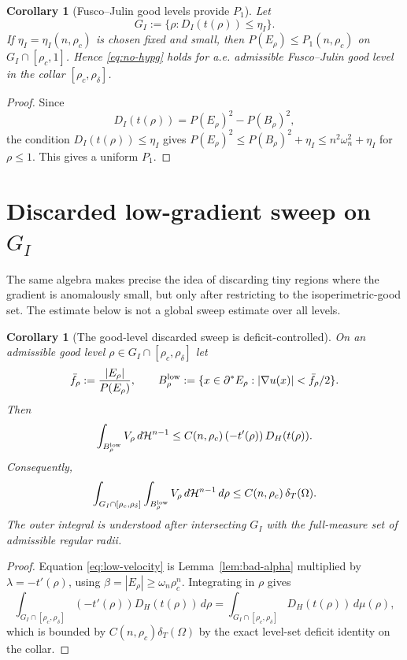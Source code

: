 \documentclass[11pt]{article}
\newtheorem{corollary}[theorem]{Corollary}
\theoremstyle{definition}
\newcommand{\Om}{\Omega}
\newcommand{\Hn}{\mathcal H^{n-1}}
\begin{document}
\begin{corollary}[Fusco--Julin good levels provide $P_1$]
\label{cor:FJ-good}
Let
\[
   G_I:=\{\rho: D_I(t(\rho))\le\eta_I\}.
\]
If $\eta_I=\eta_I(n,\rho_c)$ is chosen fixed and small, then
$P(E_\rho)\le P_1(n,\rho_c)$ on $G_I\cap[\rho_c,1]$.  Hence
\eqref{eq:no-hypg} holds for a.e. admissible Fusco--Julin good level in
the collar $[\rho_c,\rho_\delta]$.
\end{corollary}

\begin{proof}
Since
\[
   D_I(t(\rho))=P(E_\rho)^2-P(B_\rho)^2,
\]
the condition $D_I(t(\rho))\le\eta_I$ gives
$P(E_\rho)^2\le P(B_\rho)^2+\eta_I\le n^2\omega_n^2+\eta_I$ for
$\rho\le1$.  This gives a uniform $P_1$.
\end{proof}

\section{Discarded low-gradient sweep on $G_I$}

The same algebra makes precise the idea of discarding tiny regions where
the gradient is anomalously small, but only after restricting to the
isoperimetric-good set.  The estimate below is not a global sweep
estimate over all levels.

\begin{corollary}[The good-level discarded sweep is deficit-controlled]
\label{cor:sweep}
On an admissible good level $\rho\in G_I\cap[\rho_c,\rho_\delta]$ let
\[
   \bar f_\rho:=\frac{|E_\rho|}{P(E_\rho)},\qquad
   B_\rho^{\rm low}:=\{x\in\partial^*E_\rho:
      |\nabla u(x)|<\bar f_\rho/2\}.
\]
Then
\begin{equation}\label{eq:low-velocity}
   \int_{B_\rho^{\rm low}}V_\rho\,d\Hn
   \le C(n,\rho_c)\,(-t'(\rho))\,D_H(t(\rho)).
\end{equation}
Consequently,
\begin{equation}\label{eq:swept-volume}
   \int_{G_I\cap[\rho_c,\rho_\delta]}
      \int_{B_\rho^{\rm low}}V_\rho\,d\Hn\,d\rho
   \le C(n,\rho_c)\,\delta_T(\Om).
\end{equation}
The outer integral is understood after intersecting $G_I$ with the
full-measure set of admissible regular radii.
\end{corollary}

\begin{proof}
Equation \eqref{eq:low-velocity} is Lemma~\ref{lem:bad-alpha} multiplied
by $\lambda=-t'(\rho)$, using
$\beta=|E_\rho|\ge\omega_n\rho_c^n$.  Integrating in $\rho$ gives
\[
   \int_{G_I\cap[\rho_c,\rho_\delta]}
      (-t'(\rho))D_H(t(\rho))\,d\rho
   =\int_{G_I\cap[\rho_c,\rho_\delta]}D_H(t(\rho))\,d\mu(\rho),
\]
which is bounded by $C(n,\rho_c)\delta_T(\Om)$ by the exact level-set
deficit identity on the collar.
\end{proof}
\end{document}
